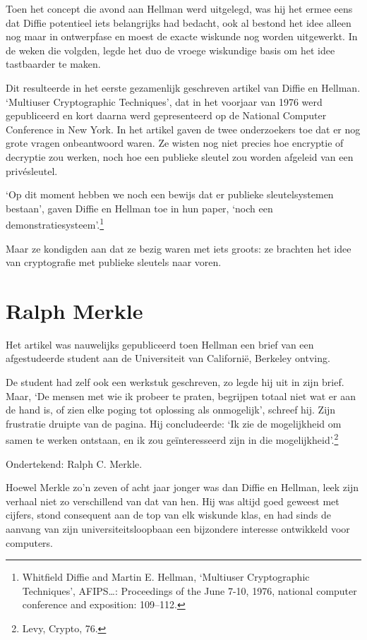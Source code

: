 \documentclass[smalldemyvopaper,11pt,twoside,onecolumn,openright,extrafontsizes,hidelinks]{memoir}
\begin{document}
Toen het concept die avond aan Hellman werd uitgelegd, was hij het ermee
eens dat Diffie potentieel iets belangrijks had bedacht, ook al bestond
het idee alleen nog maar in ontwerpfase en moest de exacte wiskunde nog
worden uitgewerkt. In de weken die volgden, legde het duo de vroege
wiskundige basis om het idee tastbaarder te maken.

Dit resulteerde in het eerste gezamenlijk geschreven artikel van Diffie
en Hellman. `Multiuser Cryptographic Techniques', dat in het voorjaar
van 1976 werd gepubliceerd en kort daarna werd gepresenteerd op de
National Computer Conference in New York. In het artikel gaven de twee
onderzoekers toe dat er nog grote vragen onbeantwoord waren. Ze wisten
nog niet precies hoe encryptie of decryptie zou werken, noch hoe een
publieke sleutel zou worden afgeleid van een privésleutel.

`Op dit moment hebben we noch een bewijs dat er publieke sleutelsystemen
bestaan', gaven Diffie en Hellman toe in hun paper, `noch een
demonstratiesysteem'.\footnote{Whitfield Diffie and Martin E. Hellman,
  `Multiuser Cryptographic Techniques', AFIPS\ldots: Proceedings of the
  June 7-10, 1976, national computer conference and exposition:
  109--112.}

Maar ze kondigden aan dat ze bezig waren met iets groots: ze brachten
het idee van cryptografie met publieke sleutels naar voren.

\section{Ralph Merkle}\label{ralph-merkle}

Het artikel was nauwelijks gepubliceerd toen Hellman een brief van een
afgestudeerde student aan de Universiteit van Californië, Berkeley
ontving.

De student had zelf ook een werkstuk geschreven, zo legde hij uit in
zijn brief. Maar, `De mensen met wie ik probeer te praten, begrijpen
totaal niet wat er aan de hand is, of zien elke poging tot oplossing als
onmogelijk', schreef hij. Zijn frustratie druipte van de pagina. Hij
concludeerde: `Ik zie de mogelijkheid om samen te werken ontstaan, en ik
zou geïnteresseerd zijn in die mogelijkheid'.\footnote{\hspace{0pt}Levy,
  Crypto, 76.}

Ondertekend: Ralph C. Merkle.

Hoewel Merkle zo'n zeven of acht jaar jonger was dan Diffie en Hellman,
leek zijn verhaal niet zo verschillend van dat van hen. Hij was altijd
goed geweest met cijfers, stond consequent aan de top van elk wiskunde
klas, en had sinds de aanvang van zijn universiteitsloopbaan een
bijzondere interesse ontwikkeld voor computers.
\end{document}
